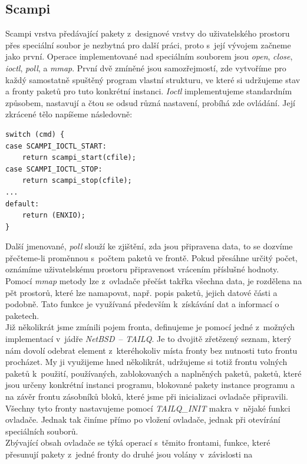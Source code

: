 \documentclass[final,11pt]{fithesis}
\newcommand{\nbsd}{\emph{NetBSD}}
\begin{document}
  \subsection{Scampi}
  Scampi vrstva předávající pakety z~designové vrstvy do
  uživatelského prostoru přes speciální soubor je nezbytná pro další práci,
  proto s~její vývojem začneme jako první.
  Operace implementované nad speciálním souborem jsou \emph{open}, \emph{close},
  \emph{ioctl}, \emph{poll}, a \emph{mmap}. První dvě zmíněné jsou
  samozřejmostí, zde vytvoříme pro každý samostatně spuštěný program vlastní
  strukturu, ve které
  si udržujeme stav a fronty paketů pro tuto konkrétní instanci. \emph{Ioctl}
  implementujeme standardním způsobem, nastavují a čtou se odsud různá
  nastavení, probíhá zde ovládání. Její zkrácené tělo napíšeme následovně:
\begin{verbatim}
switch (cmd) {
case SCAMPI_IOCTL_START:
    return scampi_start(cfile);
case SCAMPI_IOCTL_STOP:
    return scampi_stop(cfile);
...
default:
    return (ENXIO);
}
\end{verbatim}
  Další jmenované, \emph{poll} slouží ke zjištění, zda jsou připravena data,
  to se dozvíme přečteme-li proměnnou s~počtem paketů ve frontě. Pokud
  přesáhne určitý počet, oznámíme uživatelskému prostoru připravenost vrácením
  příslušné hodnoty. \\ \indent
  Pomocí \emph{mmap} metody lze z~ovladače přečíst takřka všechna data, je
  rozdělena na pět prostorů, které lze namapovat, např. popis paketů, jejich
  datové části a podobně. Tato funkce je využívaná především k~získávání
  dat a informací o paketech. \\ \indent
  Již několikrát jsme zmínili pojem fronta, definujeme je pomocí jedné
  z~možných implementací v~jádře \nbsd\ -- \emph{TAILQ}. Je to dvojitě zřetězený
  seznam, který nám dovolí odebrat element z~kteréhokoliv místa fronty bez
  nutnosti tuto frontu procházet. My ji využijeme hned několikrát, udržujeme
  si totiž frontu volných paketů k~použití, používaných, zablokovaných
  a naplněných paketů, paketů, které jsou určeny konkrétní instanci programu,
  blokované
  pakety instance programu a na závěr frontu zásobníků bloků, které jsme při
  inicializaci ovladače připravili. Všechny tyto fronty nastavujeme pomocí
  \emph{TAILQ\_INIT} makra v~nějaké funkci ovladače. Jednak tak činíme přímo
  po vložení ovladače, jednak při otevírání speciálních souborů. \\ \indent
  Zbývající obsah ovladače se týká operací s~těmito frontami, funkce, které
  přesunují pakety z~jedné fronty do druhé jsou volány v~závislosti na
\end{document}
